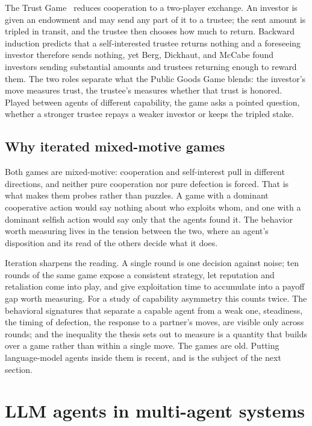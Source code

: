 The Trust Game~\cite{berg1995trust} reduces cooperation to a two-player exchange. An
investor is given an endowment and may send any part of it to a trustee; the sent amount
is tripled in transit, and the trustee then chooses how much to return. Backward induction
predicts that a self-interested trustee returns nothing and a foreseeing investor
therefore sends nothing, yet Berg, Dickhaut, and McCabe found investors sending
substantial amounts and trustees returning enough to reward them. The two roles separate
what the Public Goods Game blends: the investor's move measures trust, the trustee's
measures whether that trust is honored. Played between agents of different capability, the
game asks a pointed question, whether a stronger trustee repays a weaker investor or keeps
the tripled stake.

\subsection{Why iterated mixed-motive games}
\label{subsec:bg-iterated}

Both games are mixed-motive: cooperation and self-interest pull in different directions,
and neither pure cooperation nor pure defection is forced. That is what makes them probes
rather than puzzles. A game with a dominant cooperative action would say nothing about who
exploits whom, and one with a dominant selfish action would say only that the agents found
it. The behavior worth measuring lives in the tension between the two, where an agent's
disposition and its read of the others decide what it does.

Iteration sharpens the reading. A single round is one decision against noise; ten rounds
of the same game expose a consistent strategy, let reputation and retaliation come into
play, and give exploitation time to accumulate into a payoff gap worth measuring. For a
study of capability asymmetry this counts twice. The behavioral signatures that separate a
capable agent from a weak one, steadiness, the timing of defection, the response to a
partner's moves, are visible only across rounds; and the inequality the thesis sets out to
measure is a quantity that builds over a game rather than within a single move. The games
are old. Putting language-model agents inside them is recent, and is the subject of the
next section.

\section{LLM agents in multi-agent systems}
\label{sec:bg-llm-agents}

